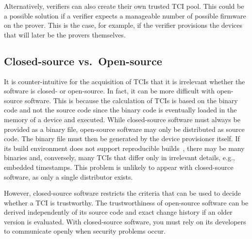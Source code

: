 Alternatively, verifiers can also create their own trusted TCI pool.
This could be a possible solution if a verifier expects a manageable number of possible firmware on the prover.
This is the case, for example, if the verifier provisions the devices that will later be the provers themselves.

\subsection{Closed-source vs.\ Open-source}

It is counter-intuitive for the acquisition of TCIs that it is irrelevant whether the software is closed- or open-source.
In fact, it can be more difficult with open-source software.
This is because the calculation of TCIs is based on the binary code and not the source code since the binary code is eventually loaded in the memory of a device and executed.
While closed-source software must always be provided as a binary file, open-source software may only be distributed as source code.
The binary file must then be generated by the device provisioner itself.
If its build environment does not support reproducible builds~\cite{Lamb2022}, there may be many binaries and, conversely, many TCIs that differ only in irrelevant details, e.g., embedded timestamps.
This problem is unlikely to appear with closed-source software, as only a single distributor exists.

However, closed-source software restricts the criteria that can be used to decide whether a TCI is trustworthy.
The trustworthiness of open-source software can be derived independently of its source code and exact change history if an older version is evaluated.
With closed-source software, you must rely on its developers to communicate openly when security problems occur.




